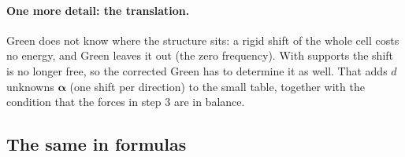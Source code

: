 \documentclass[11pt,a4paper]{article}
\begin{document}
\paragraph{One more detail: the translation.} Green does not know where the structure sits: a rigid shift of the whole
cell costs no energy, and Green leaves it out (the zero frequency). With supports the shift is no longer free, so the
corrected Green has to determine it as well. That adds $d$ unknowns $\boldsymbol{\alpha}$ (one shift per direction)
to the small table, together with the condition that the forces in step 3 are in balance.

\subsection*{The same in formulas}
\end{document}
